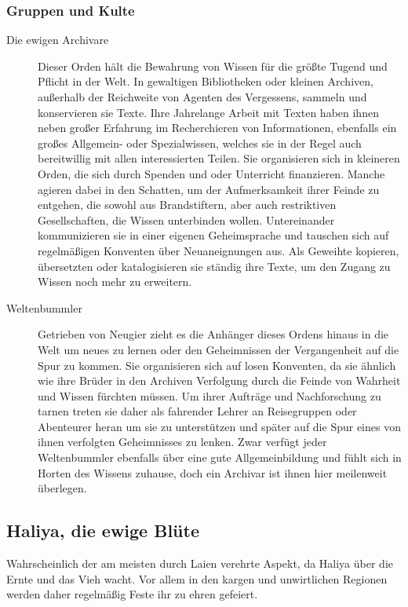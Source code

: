 \documentclass[a4paper,12pt,oneside]{book}
\begin{document}
\subsubsection{Gruppen und Kulte}
\begin{description}
\item[Die ewigen Archivare]
Dieser Orden hält die Bewahrung von Wissen für die größte Tugend und Pflicht in der Welt. In gewaltigen Bibliotheken oder kleinen Archiven, außerhalb der Reichweite von Agenten des Vergessens, sammeln und konservieren sie Texte. Ihre Jahrelange Arbeit mit Texten haben ihnen neben großer Erfahrung im Recherchieren von Informationen, ebenfalls ein großes Allgemein- oder Spezialwissen, welches sie in der Regel auch bereitwillig mit allen interessierten Teilen. Sie organisieren sich in kleineren Orden, die sich durch Spenden und oder Unterricht finanzieren. Manche agieren dabei in den Schatten, um der Aufmerksamkeit ihrer Feinde zu entgehen, die sowohl aus Brandstiftern, aber auch restriktiven Gesellschaften, die Wissen unterbinden wollen. Untereinander kommunizieren sie in einer eigenen Geheimsprache und tauschen sich auf regelmäßigen Konventen über Neuaneignungen aus. Als Geweihte kopieren, übersetzten oder katalogisieren sie ständig ihre Texte, um den Zugang zu Wissen noch mehr zu erweitern.
\item[Weltenbummler]
Getrieben von Neugier zieht es die Anhänger dieses Ordens hinaus in die Welt um neues zu lernen oder den Geheimnissen der Vergangenheit auf die Spur zu kommen. Sie organisieren sich auf losen Konventen, da sie ähnlich wie ihre Brüder in den Archiven Verfolgung durch die Feinde von Wahrheit und Wissen fürchten müssen. Um ihrer Aufträge und Nachforschung zu tarnen treten sie daher als fahrender Lehrer an Reisegruppen oder Abenteurer heran um sie zu unterstützen und später auf die Spur eines von ihnen verfolgten Geheimnisses zu lenken. Zwar verfügt jeder Weltenbummler ebenfalls über eine gute Allgemeinbildung und fühlt sich in Horten des Wissens zuhause, doch ein Archivar ist ihnen hier meilenweit überlegen.
\end{description}

\subsection{Haliya, die ewige Blüte}
Wahrscheinlich der am meisten durch Laien verehrte Aspekt, da Haliya über die Ernte und das Vieh wacht. Vor allem in den kargen und unwirtlichen Regionen werden daher regelmäßig Feste ihr zu ehren gefeiert.
\end{document}
